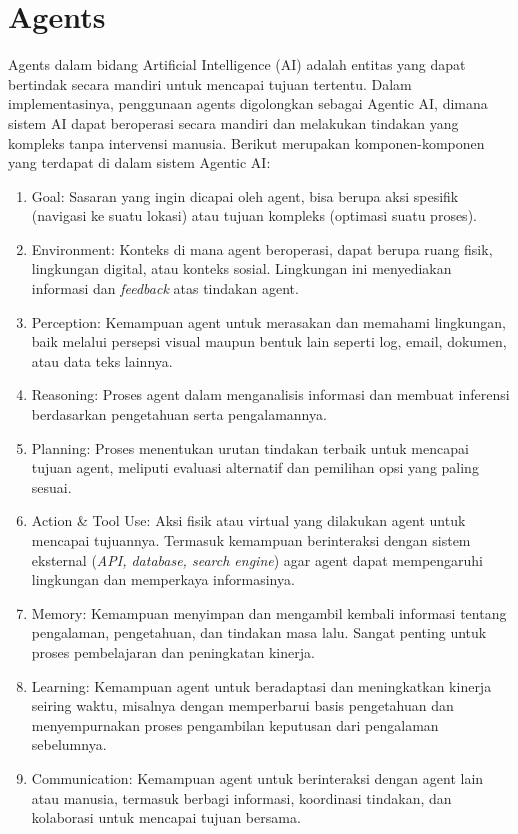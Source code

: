 \section{Agents}
\label{sec:agents}

Agents dalam bidang Artificial Intelligence (AI) adalah entitas yang dapat bertindak secara mandiri untuk mencapai tujuan tertentu. Dalam implementasinya, penggunaan agents digolongkan sebagai Agentic AI, dimana sistem AI dapat beroperasi secara mandiri dan melakukan tindakan yang kompleks tanpa intervensi manusia. Berikut merupakan komponen-komponen yang terdapat di dalam sistem Agentic AI:

\begin{enumerate}
    \item Goal: Sasaran yang ingin dicapai oleh agent, bisa berupa aksi spesifik (navigasi ke suatu lokasi) atau tujuan kompleks (optimasi suatu proses).
    \item Environment: Konteks di mana agent beroperasi, dapat berupa ruang fisik, lingkungan digital, atau konteks sosial. Lingkungan ini menyediakan informasi dan \textit{feedback} atas tindakan agent.
    \item Perception: Kemampuan agent untuk merasakan dan memahami lingkungan, baik melalui persepsi visual maupun bentuk lain seperti log, email, dokumen, atau data teks lainnya.
    \item Reasoning: Proses agent dalam menganalisis informasi dan membuat inferensi berdasarkan pengetahuan serta pengalamannya.
    \item Planning: Proses menentukan urutan tindakan terbaik untuk mencapai tujuan agent, meliputi evaluasi alternatif dan pemilihan opsi yang paling sesuai.
    \item Action \& Tool Use: Aksi fisik atau virtual yang dilakukan agent untuk mencapai tujuannya. Termasuk kemampuan berinteraksi dengan sistem eksternal (\textit{API, database, search engine}) agar agent dapat mempengaruhi lingkungan dan memperkaya informasinya.
    \item Memory: Kemampuan menyimpan dan mengambil kembali informasi tentang pengalaman, pengetahuan, dan tindakan masa lalu. Sangat penting untuk proses pembelajaran dan peningkatan kinerja.
    \item Learning: Kemampuan agent untuk beradaptasi dan meningkatkan kinerja seiring waktu, misalnya dengan memperbarui basis pengetahuan dan menyempurnakan proses pengambilan keputusan dari pengalaman sebelumnya.
    \item Communication: Kemampuan agent untuk berinteraksi dengan agent lain atau manusia, termasuk berbagi informasi, koordinasi tindakan, dan kolaborasi untuk mencapai tujuan bersama.
\end{enumerate}